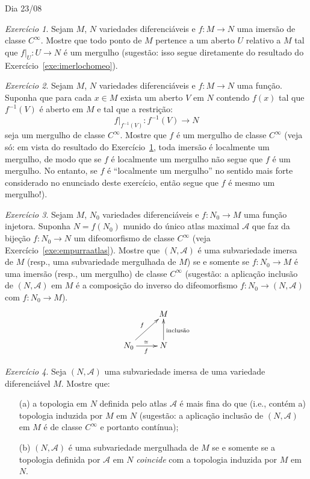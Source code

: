 \documentclass[oneside,11pt]{amsart}
\theoremstyle{remark}\newtheorem{exercise}{Exercício}[section]
\theoremstyle{plain}\newtheorem{teo}{Teorema}[section]
\theoremstyle{plain}\newtheorem{lem}[teo]{Lema}
\theoremstyle{plain}\newtheorem{prop}[teo]{Proposição}
\theoremstyle{definition}\newtheorem{defin}[teo]{Definição}
\theoremstyle{remark}\newtheorem{rem}[teo]{Observação}
\theoremstyle{definition}\newtheorem{example}[teo]{Exemplo}
\numberwithin{equation}{section}
\begin{document}
\begin{section}{Dia 23/08}
\begin{exercise}\label{exe:imerlocmerg}
Sejam $M$, $N$ variedades diferenciáveis e $f:M\to N$ uma imersão de classe $C^\infty$. Mostre que todo ponto de $M$ pertence a um aberto $U$
relativo a $M$ tal que $f\vert_U:U\to N$ é um mergulho (sugestão: isso segue diretamente do resultado do Exercício~\ref{exe:imerlochomeo}).
\end{exercise}

\begin{exercise}\label{exe:condmergulho}
Sejam $M$, $N$ variedades diferenciáveis e $f:M\to N$ uma função. Suponha que para cada $x\in M$ exista um aberto $V$ em $N$ contendo $f(x)$ tal que
$f^{-1}(V)$ é aberto em $M$ e tal que a restrição:
\[f\vert_{f^{-1}(V)}:f^{-1}(V)\longrightarrow N\]
seja um mergulho de classe $C^\infty$. Mostre que $f$ é um mergulho de classe $C^\infty$ (veja só: em vista do resultado do Exercício~\ref{exe:imerlocmerg},
toda imersão é localmente um mergulho, de modo que se $f$ é localmente um mergulho não segue que $f$ é um mergulho. No entanto, se $f$ é ``localmente
um mergulho'' no sentido mais forte considerado no enunciado deste exercício, então segue que $f$ é mesmo um mergulho!).
\end{exercise}

\begin{exercise}\label{exe:imagemimersaomerg}
Sejam $M$, $N_0$ variedades diferenciáveis e $f:N_0\to M$ uma função injetora. Suponha $N=f(N_0)$ munido do único atlas maximal
$\mathcal A$ que faz da bijeção $f:N_0\to N$ um difeomorfismo de classe $C^\infty$ (veja Exercício~\ref{exe:empurraatlas}). Mostre que $(N,\mathcal A)$
é uma subvariedade imersa de $M$ (resp., uma subvariedade mergulhada de $M$) se e somente se $f:N_0\to M$ é uma imersão (resp., um mergulho) de classe $C^\infty$ (sugestão:
a aplicação inclusão de $(N,\mathcal A)$ em $M$ é a composição do inverso do difeomorfismo $f:N_0\to(N,\mathcal A)$ com $f:N_0\to M$).
\[\xymatrix{%
&M\\
N_0\ar[ur]^f\ar[r]_f^{\scriptscriptstyle\cong}&N\ar[u]_{\text{inclusão}}}\]
\end{exercise}

\begin{exercise}
Seja $(N,\mathcal A)$ uma subvariedade imersa de uma variedade diferenciável $M$. Mostre que:
\begin{itemize}
\item[(a)] a topologia em $N$ definida pelo atlas $\mathcal A$ é mais fina do que (i.e., contém a) topologia induzida por $M$ em $N$ (sugestão:
a aplicação inclusão de $(N,\mathcal A)$ em $M$ é de classe $C^\infty$ e portanto contínua);
\item[(b)] $(N,\mathcal A)$ é uma subvariedade mergulhada de $M$ se e somente se a topologia definida por $\mathcal A$ em $N$ {\em coincide\/}
com a topologia induzida por $M$ em $N$.
\end{itemize}
\end{exercise}


\end{section}
\end{document}
